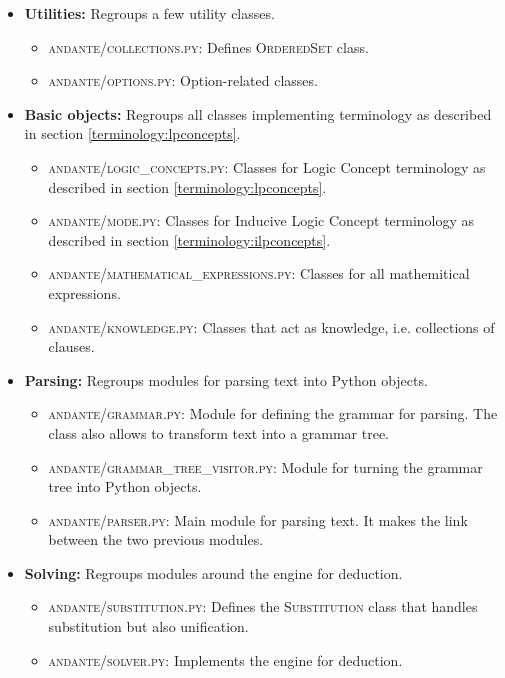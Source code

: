\documentclass{article}
\begin{document}
\begin{itemize}
    \item \textbf{Utilities:} Regroups a few utility classes.
    \begin{itemize}
        \item \textsc{andante/collections.py}: Defines \textsc{OrderedSet} class.
        \item \textsc{andante/options.py}: Option-related classes.
    \end{itemize}
    
\item \textbf{Basic objects:} Regroups all classes implementing terminology
    as described in section \ref{terminology:lpconcepts}.
    \begin{itemize}
        \item \textsc{andante/logic\_concepts.py}: Classes for Logic Concept terminology
            as described in section \ref{terminology:lpconcepts}.
        \item \textsc{andante/mode.py}: Classes for Inducive Logic Concept terminology
            as described in section \ref{terminology:ilpconcepts}.
        \item \textsc{andante/mathematical\_expressions.py}: Classes for all
            mathemitical expressions.
        \item \textsc{andante/knowledge.py}: Classes that act as knowledge, i.e.
            collections of clauses.
    \end{itemize}
    
    \item \textbf{Parsing:} Regroups modules for parsing text into Python
        objects.
    \begin{itemize}
        \item \textsc{andante/grammar.py}: Module for defining the grammar for parsing.
            The class also allows to transform text into a grammar tree.
        \item \textsc{andante/grammar\_tree\_visitor.py}: Module for turning the grammar
            tree into Python objects.
        \item \textsc{andante/parser.py}: Main module for parsing text. It makes the
            link between the two previous modules.
    \end{itemize}
    
    \item \textbf{Solving:} Regroups modules around the engine for deduction.
    \begin{itemize}
        \item \textsc{andante/substitution.py}: Defines the \textsc{Substitution} class
            that handles substitution but also unification.
        \item \textsc{andante/solver.py}: Implements the engine for deduction.
    \end{itemize}
    

\end{itemize}
\end{document}
